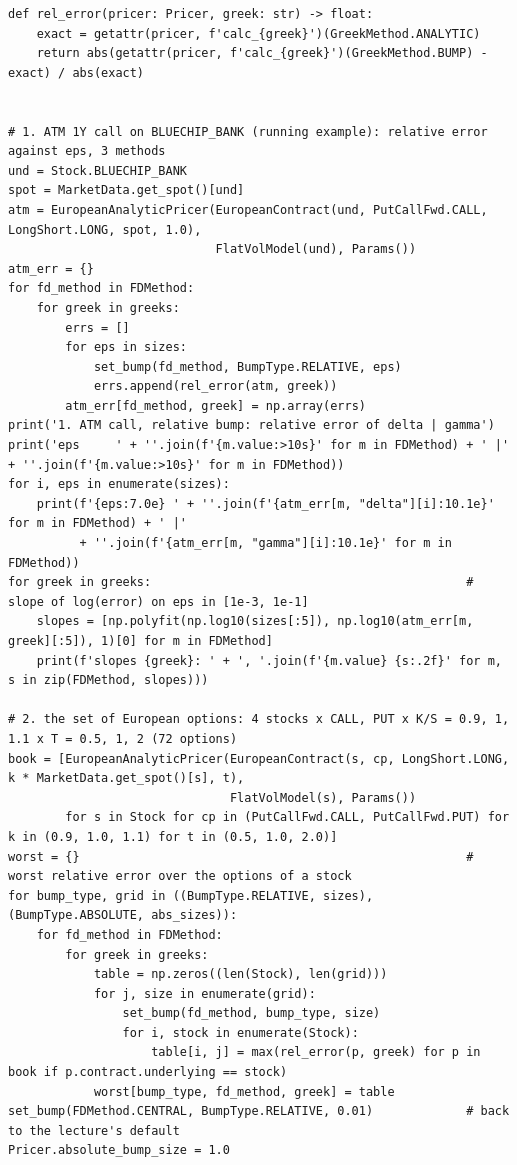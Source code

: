 \documentclass[11pt,a4paper]{article}
\begin{document}
\begin{lstlisting}[style=pysmall]
def rel_error(pricer: Pricer, greek: str) -> float:
    exact = getattr(pricer, f'calc_{greek}')(GreekMethod.ANALYTIC)
    return abs(getattr(pricer, f'calc_{greek}')(GreekMethod.BUMP) - exact) / abs(exact)


# 1. ATM 1Y call on BLUECHIP_BANK (running example): relative error against eps, 3 methods
und = Stock.BLUECHIP_BANK
spot = MarketData.get_spot()[und]
atm = EuropeanAnalyticPricer(EuropeanContract(und, PutCallFwd.CALL, LongShort.LONG, spot, 1.0),
                             FlatVolModel(und), Params())
atm_err = {}
for fd_method in FDMethod:
    for greek in greeks:
        errs = []
        for eps in sizes:
            set_bump(fd_method, BumpType.RELATIVE, eps)
            errs.append(rel_error(atm, greek))
        atm_err[fd_method, greek] = np.array(errs)
print('1. ATM call, relative bump: relative error of delta | gamma')
print('eps     ' + ''.join(f'{m.value:>10s}' for m in FDMethod) + ' |' + ''.join(f'{m.value:>10s}' for m in FDMethod))
for i, eps in enumerate(sizes):
    print(f'{eps:7.0e} ' + ''.join(f'{atm_err[m, "delta"][i]:10.1e}' for m in FDMethod) + ' |'
          + ''.join(f'{atm_err[m, "gamma"][i]:10.1e}' for m in FDMethod))
for greek in greeks:                                            # slope of log(error) on eps in [1e-3, 1e-1]
    slopes = [np.polyfit(np.log10(sizes[:5]), np.log10(atm_err[m, greek][:5]), 1)[0] for m in FDMethod]
    print(f'slopes {greek}: ' + ', '.join(f'{m.value} {s:.2f}' for m, s in zip(FDMethod, slopes)))

# 2. the set of European options: 4 stocks x CALL, PUT x K/S = 0.9, 1, 1.1 x T = 0.5, 1, 2 (72 options)
book = [EuropeanAnalyticPricer(EuropeanContract(s, cp, LongShort.LONG, k * MarketData.get_spot()[s], t),
                               FlatVolModel(s), Params())
        for s in Stock for cp in (PutCallFwd.CALL, PutCallFwd.PUT) for k in (0.9, 1.0, 1.1) for t in (0.5, 1.0, 2.0)]
worst = {}                                                      # worst relative error over the options of a stock
for bump_type, grid in ((BumpType.RELATIVE, sizes), (BumpType.ABSOLUTE, abs_sizes)):
    for fd_method in FDMethod:
        for greek in greeks:
            table = np.zeros((len(Stock), len(grid)))
            for j, size in enumerate(grid):
                set_bump(fd_method, bump_type, size)
                for i, stock in enumerate(Stock):
                    table[i, j] = max(rel_error(p, greek) for p in book if p.contract.underlying == stock)
            worst[bump_type, fd_method, greek] = table
set_bump(FDMethod.CENTRAL, BumpType.RELATIVE, 0.01)             # back to the lecture's default
Pricer.absolute_bump_size = 1.0


\end{lstlisting}
\end{document}
